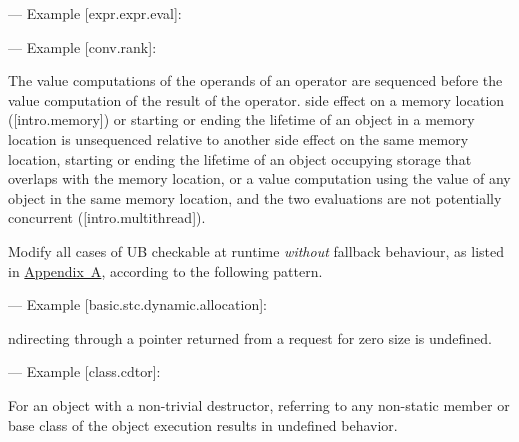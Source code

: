 --- Example [expr.expr.eval]:

\begin{adjustwidth}{0.5cm}{0.5cm}
\end{adjustwidth}

--- Example [conv.rank]:

\begin{adjustwidth}{0.5cm}{0.5cm}
The value computations of the operands of an operator are sequenced before the value computation of the result of the operator.   side effect on a memory location ([intro.memory]) or starting or ending the lifetime of an object in a memory location is unsequenced relative to another side effect on the same memory location, starting or ending the lifetime of an object occupying storage that overlaps with the memory location, or a value computation using the value of any object in the same memory location, and the two evaluations are not potentially concurrent ([intro.multithread]).
\end{adjustwidth}

Modify all cases of UB checkable at runtime \emph{without} fallback behaviour, as listed in \hyperref[appendix]{Appendix~A}, according to the following pattern. 

--- Example [basic.stc.dynamic.allocation]:

\begin{adjustwidth}{0.5cm}{0.5cm}
ndirecting through a pointer  returned from a request for zero size is undefined.
\end{adjustwidth}

--- Example [class.cdtor]:

\begin{adjustwidth}{0.5cm}{0.5cm}
For an object with a non-trivial destructor, referring to any non-static member or base class of the object  execution results in undefined behavior.
\end{adjustwidth}

